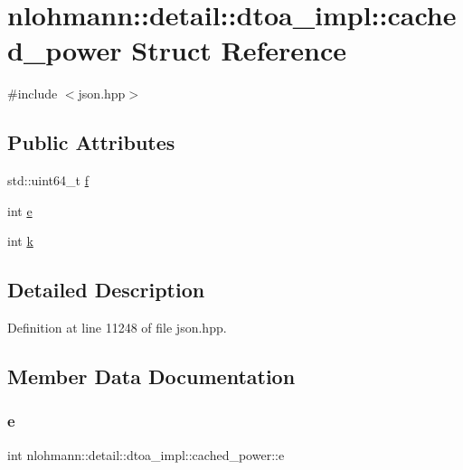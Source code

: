 \hypertarget{structnlohmann_1_1detail_1_1dtoa__impl_1_1cached__power}{}\section{nlohmann\+::detail\+::dtoa\+\_\+impl\+::cached\+\_\+power Struct Reference}
\label{structnlohmann_1_1detail_1_1dtoa__impl_1_1cached__power}


{\ttfamily \#include $<$json.\+hpp$>$}

\subsection*{Public Attributes}
\begin{DoxyCompactItemize}
\item 
std\+::uint64\+\_\+t \mbox{\hyperlink{structnlohmann_1_1detail_1_1dtoa__impl_1_1cached__power_a21ae81f515f5b08d5bf423775ee56074}{f}}
\item 
int \mbox{\hyperlink{structnlohmann_1_1detail_1_1dtoa__impl_1_1cached__power_a9e89bc89bb7bf4361f43ea27eed91d23}{e}}
\item 
int \mbox{\hyperlink{structnlohmann_1_1detail_1_1dtoa__impl_1_1cached__power_a8c1f2efed643eeaa8fae83c697a29c6a}{k}}
\end{DoxyCompactItemize}


\subsection{Detailed Description}


Definition at line 11248 of file json.\+hpp.



\subsection{Member Data Documentation}
\mbox{\label{structnlohmann_1_1detail_1_1dtoa__impl_1_1cached__power_a9e89bc89bb7bf4361f43ea27eed91d23}} 
\subsubsection{\texorpdfstring{e}{e}}
{\footnotesize\ttfamily int nlohmann\+::detail\+::dtoa\+\_\+impl\+::cached\+\_\+power\+::e}




